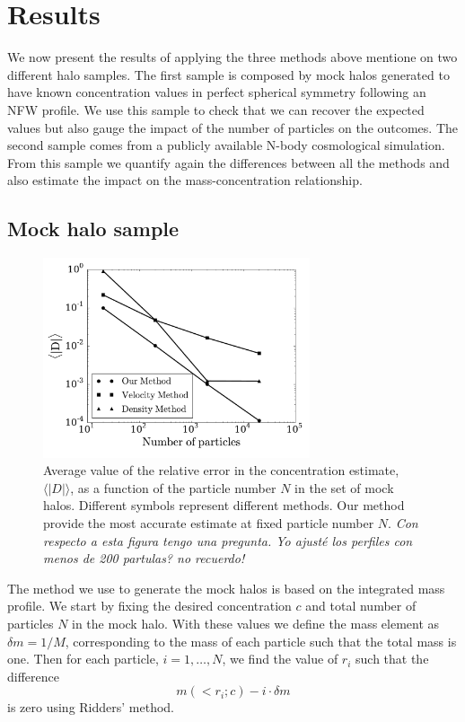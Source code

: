 \documentclass[a4,useAMS,usenatbib,usegraphicx]{mn2e}
\newcommand{\avg}[1]{\langle{#1}\rangle}
\begin{document}
\section{Results}
\label{sec:results}

We now present the results of applying the three methods above
mentione on two different halo samples.  The first sample is composed
by mock halos generated to have known concentration values in perfect
spherical symmetry following an NFW profile.  We use this sample to
check that we can recover the expected values but also gauge the
impact of the number of particles on the outcomes.  The second sample
comes from a publicly available N-body cosmological simulation.  From
this sample we quantify again the differences between all the methods
and also estimate the impact on the mass-concentration relationship.


\subsection{Mock halo sample}

\begin{figure}
\begin{center}
  \includegraphics[width=0.70\textwidth]{error.pdf}
\end{center}
\caption{Average value of the relative error in the concentration
  estimate, $\avg{|D|}$, as a function of the particle number $N$ in
  the set of mock halos. Different symbols represent different
  methods. Our method provide the most accurate estimate at fixed
  particle number $N$.  {\it Con respecto a esta figura tengo una
    pregunta. Yo ajusté los perfiles con menos de 200 partulas? no
    recuerdo!}
    \label{fig:error}}
\end{figure}


The method we use to generate the mock halos is based on the
integrated mass profile.  
We start by fixing the desired concentration $c$ and total number of
particles $N$ in the mock halo.  
With these values we define the mass element as $\delta m = 1/M$, corresponding
to the mass of each particle such that the total mass is one.   
Then for each particle, $i=1,\ldots,N$, we find the value of $r_i$
such that the difference 
% 
\begin{equation}
m(<r_i;c) - i \cdot \delta m
\end{equation}
%
is zero using Ridders' method.
\end{document}
